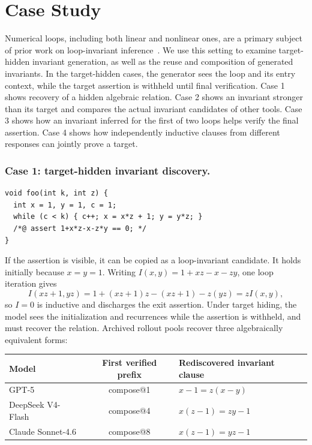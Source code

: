 


\section{Case Study}
\label{app:scope-example}

Numerical loops, including both linear and nonlinear ones, are a primary
subject of prior
work on loop-invariant
inference~\citep{si2020code2inv,yu2023lipus,kamath2024leveraging}. We use this
setting to examine target-hidden invariant generation, as well as the reuse
and composition of generated invariants. In the target-hidden cases, the
generator sees the loop and its entry context, while the target assertion is
withheld until final verification. Case 1 shows
recovery of a hidden algebraic relation. Case 2 shows an invariant stronger
than its target and compares the actual invariant candidates of other tools.
Case 3 shows how an invariant inferred for the first of two loops helps verify
the final assertion.
Case 4 shows how independently inductive clauses from different responses
can jointly prove a target.

\subsubsection*{Case 1: target-hidden invariant discovery.}
\begin{lstlisting}[numbers=none]
void foo(int k, int z) {
  int x = 1, y = 1, c = 1;
  while (c < k) { c++; x = x*z + 1; y = y*z; }
  /*@ assert 1+x*z-x-z*y == 0; */
}
\end{lstlisting}

If the assertion is visible, it can be copied as a loop-invariant candidate.
It holds initially because \(x=y=1\).  Writing
\(I(x,y)=1+xz-x-zy\), one loop iteration gives
\[
  I(xz+1,yz)
  =1+(xz+1)z-(xz+1)-z(yz)
  =zI(x,y),
\]
so \(I=0\) is inductive and discharges the exit assertion. Under target
hiding, the model sees the initialization and recurrences while the assertion
is withheld, and must recover the relation. Archived rollout pools recover
three algebraically equivalent forms:

\begin{center}
\small
\begin{tabular}{lcl}
\toprule
\rowcolor{algobg}
Model & First verified prefix & Rediscovered invariant clause \\
\midrule
GPT-5 & compose@1 & \(x-1=z(x-y)\) \\
DeepSeek V4-Flash & compose@4 & \(x(z-1)=zy-1\) \\
Claude Sonnet-4.6 & compose@8 & \(x(z-1)=yz-1\) \\
\bottomrule
\end{tabular}
\end{center}

